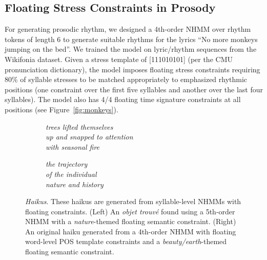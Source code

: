 \documentclass[phd,electronic,oneside,twosidetoc,letterpaper,chaptercenter,parttop,lol,lof,lot]{byumsphd}
\begin{document}
\subsection{Floating Stress Constraints in Prosody}

For generating prosodic rhythm, we designed a 4th-order NHMM over rhythm tokens of length 6 to generate suitable rhythms for the lyrics ``No more monkeys jumping on the bed''. We trained the model on lyric/rhythm sequences from the Wikifonia dataset. Given a stress template of [111010101] (per the CMU pronunciation dictionary), the model imposes floating stress constraints requiring 80\% of syllable stresses to be matched appropriately to emphasized rhythmic positions (one constraint over the first five syllables and another over the last four syllables). The model also has 4/4 floating time signature constraints at all positions (see Figure~\ref{fig:monkeys}). 

\begin{figure}
\centering
\begin{subfigure}[b]{.5\linewidth}
\centering
\textit{trees lifted themselves \\
up and snapped to attention \\
with seasonal fire \\}
\end{subfigure}
\begin{subfigure}[b]{.45\linewidth}
\centering
\textit{the trajectory \\
of the individual \\ 
nature and history \\}
\end{subfigure}

\caption{\textit{Haikus}. These haikus are generated from syllable-level NHMMs with floating constraints. (Left) An \textit{objet trouv\'e} found using a 5th-order NHMM with a \textit{nature}-themed floating semantic constraint. (Right) An original haiku generated from a 4th-order NHMM with floating word-level POS template constraints and a \textit{beauty/earth}-themed floating semantic constraint.}
\label{fig:haiku}
\end{figure}
\end{document}
